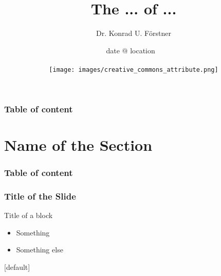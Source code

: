 \documentclass{beamer}
\begin{document}
\title{\large The ... of ...}


\author{
  {\small Dr. Konrad U. Förstner\\}
}
\date{{\footnotesize date @ location
}
  \ \\
  \ \\
  \texttt{[image: images/creative\_commons\_attribute.png]}
}  

\begin{frame}
  \titlepage 
\end{frame}

\begin{frame}
  \frametitle{Table of content}
  \tableofcontents 
\end{frame}

\section[If something else should be in the TOC]{Name of the Section}

\begin{frame}
  \frametitle{Table of content}
  \tableofcontents[currentsection]
\end{frame}

\begin{frame}
    \frametitle{Title of the Slide}
    \begin{block}{Title of a block}
      \begin{itemize}
      \item Something
      \item Something else
      \end{itemize}
    \end{block}
\end{frame}
[default]
\end{document}
